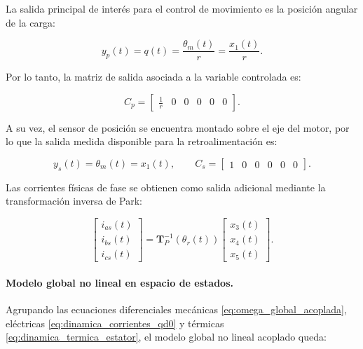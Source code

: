 \documentclass[10pt,a4paper]{article}
\begin{document}
La salida principal de interés para el control de movimiento es la posición angular de la carga:

\begin{equation*}
	y_p(t)=q(t)=\frac{\theta_m(t)}{r}=\frac{x_1(t)}{r}.
\end{equation*}

Por lo tanto, la matriz de salida asociada a la variable controlada es:

\begin{equation*}
	C_p=\begin{bmatrix}\frac{1}{r} & 0 & 0 & 0 & 0 & 0\end{bmatrix}.
\end{equation*}

A su vez, el sensor de posición se encuentra montado sobre el eje del motor, por lo que la salida medida disponible para la retroalimentación es:

\begin{equation*}
	y_s(t)=\theta_m(t)=x_1(t),
	\qquad
	C_s=\begin{bmatrix}1 & 0 & 0 & 0 & 0 & 0\end{bmatrix}.
\end{equation*}

Las corrientes físicas de fase se obtienen como salida adicional mediante la transformación inversa de Park:

\begin{equation*}
	\begin{bmatrix}
		i_{as}(t)\\
		i_{bs}(t)\\
		i_{cs}(t)
	\end{bmatrix}
	=
	\mathbf{T}_{P}^{-1}\left(\theta_r(t)\right)
	\begin{bmatrix}
		x_3(t)\\
		x_4(t)\\
		x_5(t)
	\end{bmatrix}.
\end{equation*}

\paragraph{Modelo global no lineal en espacio de estados.}
Agrupando las ecuaciones diferenciales mecánicas \eqref{eq:omega_global_acoplada}, eléctricas \eqref{eq:dinamica_corrientes_qd0} y térmicas \eqref{eq:dinamica_termica_estator}, el modelo global no lineal acoplado queda:
\end{document}
